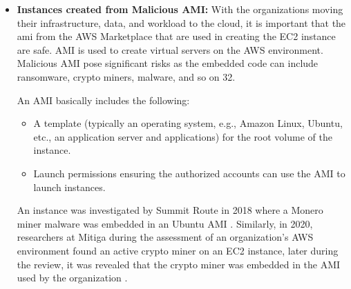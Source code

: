 \begin{itemize}
    \item \textbf{Instances created from Malicious AMI:} With the organizations moving their infrastructure, data,
    and workload to the cloud, it is important that the
    \gls{ami}
    from the AWS Marketplace that are
    used in creating the EC2 instance are safe. AMI is used to create virtual servers on the AWS environment.
    Malicious AMI pose significant risks as the embedded code can include ransomware, crypto miners, malware, and so
    on {32}.

    An AMI basically includes the following:
    \begin{itemize}
        \item A template (typically an operating system, e.g., Amazon Linux, Ubuntu, etc., an application server and applications) for the root volume of the instance.
    \end{itemize}
    \begin{itemize}
        \item Launch permissions ensuring the authorized accounts can use the AMI to launch instances.
    \end{itemize}
    An instance was investigated by Summit Route in 2018 where a Monero miner malware was embedded in an Ubuntu AMI \cite{47}.
    Similarly, in 2020, researchers at Mitiga during the assessment of an organization’s AWS environment found an
    active crypto miner on an EC2 instance, later during the review, it was revealed that the crypto miner was
    embedded in the AMI used by the organization \cite{48}.
\end{itemize}

